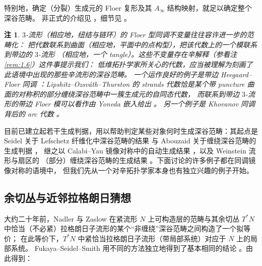 \documentclass[UTF8,a4paper,11pt,fontset=windows]{ctexart}
\theoremstyle{cnthm}
\newtheorem{rem}[thm]{注}
\numberwithin{equation}{section}
\begin{document}
特别地，确定（分裂）生成元的 Floer 复形及其 $A_\infty$ 结构映射，就足以确定整个深谷范畴。
非正式的介绍见 \cite{r22}，细节见 \cite{r92}。


\begin{rem}\label{rem:2.2}
$3$-流形（相应地，纽结与链环）的 Floer 型同调不变量往往容许进一步的范畴化：
把代数联系到曲面（相应地，平面中的点构型），把该代数上的一个模联系到带边的 $3$-流形
（相应地，一个 tangle）。这些不变量存在辛解释（参看注 \ref{rem:1.6}）这件事提示我们：
低维拓扑学家所关心的代数，应当被理解为刻画了此语境中出现的那些辛流形的深谷范畴。
一个运作良好的例子是带边 Heegaard--Floer 同调 \cite{r70}：Lipshitz--Ozsváth--Thurston 的
strands 代数恰是某个带 puncture 曲面的对称积的部分缠绕深谷范畴中一簇生成元的自同态代数，
而联系到带边 $3$-流形的带边 Floer 模可以看作由 Yoneda 嵌入给出 \cite{r21}。
另一个例子是 Khovanov 同调背后的 arc 代数 \cite{r13}。
\end{rem}

目前已建立起若干生成判据，用以帮助判定某些对象何时生成深谷范畴：其起点是 Seidel 关于
Lefschetz 纤维化中深谷范畴的结果 \cite{r92} 与 Abouzaid 关于缠绕深谷范畴的生成判据 \cite{r1}，
继之以 Calabi--Yau 镜像对称中的自动生成结果 \cite{r59}，以及 Weinstein 流形与扇区的
（部分）缠绕深谷范畴的生成结果 \cite{r57,r31}。下面讨论的许多例子都在同调镜像对称的语境中，
但我们先从一个对辛拓扑学家本身也有独立兴趣的例子开始。

\subsection{余切丛与近邻拉格朗日猜想}\label{sec:2.3}

大约二十年前，Nadler 与 Zaslow \cite{r78,r75} 在紧流形 $N$ 上可构造层的范畴与其余切丛
$T^{*}N$ 中恰当（不必紧）拉格朗日子流形的某个“非缠绕”深谷范畴之间构造了一个拟等价；
在此等价下，$T^{*}N$ 中紧恰当拉格朗日子流形（带局部系统）对应于 $N$ 上的局部系统。
Fukaya--Seidel--Smith 用不同的方法独立地得到了基本相同的结论 \cite{r47}。由此得到：
\end{document}
